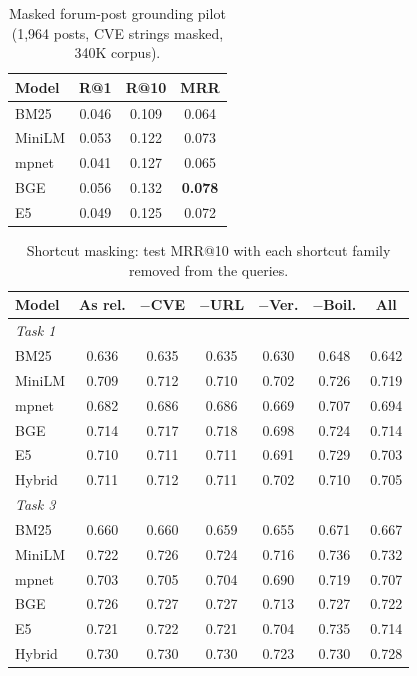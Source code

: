 \documentclass{article}
\begin{document}
\begin{table}[ht]
\centering
\small
\setlength{\tabcolsep}{3pt}
\caption{Masked forum-post grounding pilot (1,964 posts, CVE strings masked, 340K corpus).}
\label{tab:pilot}
\begin{tabular}{lccc}
\toprule
\textbf{Model} & \textbf{R@1} & \textbf{R@10} & \textbf{MRR} \\
\midrule
BM25 & 0.046 & 0.109 & 0.064 \\
MiniLM & 0.053 & 0.122 & 0.073 \\
mpnet & 0.041 & 0.127 & 0.065 \\
BGE & 0.056 & 0.132 & \textbf{0.078} \\
E5 & 0.049 & 0.125 & 0.072 \\
\bottomrule
\end{tabular}
\end{table}

\begin{table}[ht]
\centering
\small
\setlength{\tabcolsep}{4pt}
\caption{Shortcut masking: test MRR@10 with each shortcut family removed from the queries.}
\label{tab:masking}
\begin{tabular}{lcccccc}
\toprule
\textbf{Model} & \textbf{As rel.} & \textbf{$-$CVE} & \textbf{$-$URL} & \textbf{$-$Ver.} & \textbf{$-$Boil.} & \textbf{All} \\
\midrule
\multicolumn{7}{l}{\textit{Task 1}} \\
BM25 & 0.636 & 0.635 & 0.635 & 0.630 & 0.648 & 0.642 \\
MiniLM & 0.709 & 0.712 & 0.710 & 0.702 & 0.726 & 0.719 \\
mpnet & 0.682 & 0.686 & 0.686 & 0.669 & 0.707 & 0.694 \\
BGE & 0.714 & 0.717 & 0.718 & 0.698 & 0.724 & 0.714 \\
E5 & 0.710 & 0.711 & 0.711 & 0.691 & 0.729 & 0.703 \\
Hybrid & 0.711 & 0.712 & 0.711 & 0.702 & 0.710 & 0.705 \\
\midrule
\multicolumn{7}{l}{\textit{Task 3}} \\
BM25 & 0.660 & 0.660 & 0.659 & 0.655 & 0.671 & 0.667 \\
MiniLM & 0.722 & 0.726 & 0.724 & 0.716 & 0.736 & 0.732 \\
mpnet & 0.703 & 0.705 & 0.704 & 0.690 & 0.719 & 0.707 \\
BGE & 0.726 & 0.727 & 0.727 & 0.713 & 0.727 & 0.722 \\
E5 & 0.721 & 0.722 & 0.721 & 0.704 & 0.735 & 0.714 \\
Hybrid & 0.730 & 0.730 & 0.730 & 0.723 & 0.730 & 0.728 \\
\bottomrule
\end{tabular}
\end{table}
\end{document}
